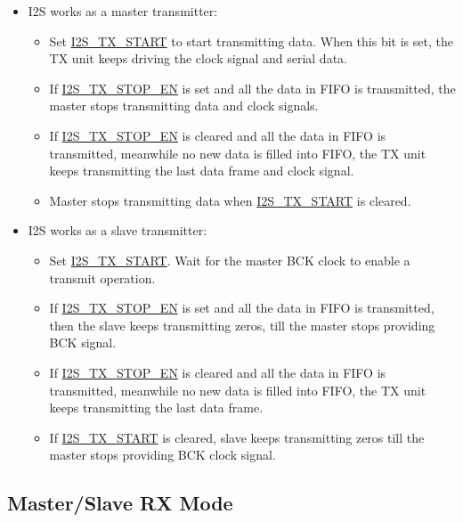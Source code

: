 \documentclass[main\_\_EN.tex]{subfiles}
\begin{document}
\begin{itemize}
    \item I2S works as a master transmitter:
    \begin{itemize}
        \item Set \hyperref[fielddesc:I2STXSTART]{I2S\_TX\_START} to start transmitting data. When this bit is set, the TX unit keeps driving the clock signal and serial data.
        \item If \hyperref[fielddesc:I2STXSTOPEN]{I2S\_TX\_STOP\_EN} is set and all the data in FIFO is transmitted, the master stops transmitting data and clock signals.
        \item If \hyperref[fielddesc:I2STXSTOPEN]{I2S\_TX\_STOP\_EN} is cleared and all the data in FIFO is transmitted, meanwhile no new data is filled into FIFO, the TX unit keeps transmitting the last data frame and clock signal.
        \item Master stops transmitting data when \hyperref[fielddesc:I2STXSTART]{I2S\_TX\_START} is cleared.
    \end{itemize}
    \item I2S works as a slave transmitter:
    \begin{itemize}
        \item Set \hyperref[fielddesc:I2STXSTART]{I2S\_TX\_START}. Wait for the master BCK clock to enable a transmit operation.
        \item If \hyperref[fielddesc:I2STXSTOPEN]{I2S\_TX\_STOP\_EN} is set and all the data in FIFO is transmitted, then the slave keeps transmitting zeros, till the master stops providing BCK signal.
        \item If \hyperref[fielddesc:I2STXSTOPEN]{I2S\_TX\_STOP\_EN} is cleared and all the data in FIFO is transmitted, meanwhile no new data is filled into FIFO, the TX unit keeps transmitting the last data frame. 
        \item If \hyperref[fielddesc:I2STXSTART]{I2S\_TX\_START} is cleared, slave keeps transmitting zeros till the master stops providing BCK clock signal.
    \end{itemize}
\end{itemize}

\subsection{Master/Slave RX Mode}\label{sec:i2s-master-slave-rx-mode}
\end{document}
